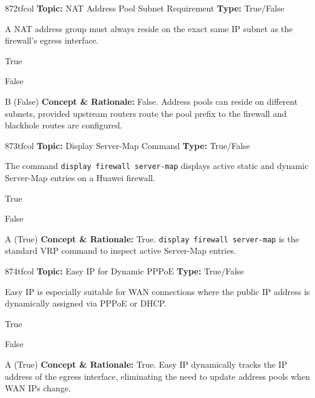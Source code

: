 \begin{qcard}{872}{tfcol}
\textcolor{darkslate!75}{\small\textbf{Topic:} NAT Address Pool Subnet Requirement \hfill \textbf{Type:} True/False}\vspace{0.4em}\par
A NAT address group must always reside on the exact same IP subnet as the firewall's egress interface.
\begin{qoptions}
\item True
\item False
\end{qoptions}
\end{qcard}
\nopagebreak
\begin{explainbox}{B (False)}
\textbf{Concept \& Rationale:} False. Address pools can reside on different subnets, provided upstream routers route the pool prefix to the firewall and blackhole routes are configured.
\end{explainbox}

\begin{qcard}{873}{tfcol}
\textcolor{darkslate!75}{\small\textbf{Topic:} Display Server-Map Command \hfill \textbf{Type:} True/False}\vspace{0.4em}\par
The command \texttt{display firewall server-map} displays active static and dynamic Server-Map entries on a Huawei firewall.
\begin{qoptions}
\item True
\item False
\end{qoptions}
\end{qcard}
\nopagebreak
\begin{explainbox}{A (True)}
\textbf{Concept \& Rationale:} True. \texttt{display firewall server-map} is the standard VRP command to inspect active Server-Map entries.
\end{explainbox}

\begin{qcard}{874}{tfcol}
\textcolor{darkslate!75}{\small\textbf{Topic:} Easy IP for Dynamic PPPoE \hfill \textbf{Type:} True/False}\vspace{0.4em}\par
Easy IP is especially suitable for WAN connections where the public IP address is dynamically assigned via PPPoE or DHCP.
\begin{qoptions}
\item True
\item False
\end{qoptions}
\end{qcard}
\nopagebreak
\begin{explainbox}{A (True)}
\textbf{Concept \& Rationale:} True. Easy IP dynamically tracks the IP address of the egress interface, eliminating the need to update address pools when WAN IPs change.
\end{explainbox}

